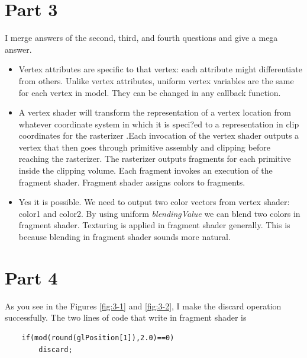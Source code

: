 \section{Part 3}

I merge answers of the second, third, and fourth questions and give a mega answer.

\begin{itemize}
  \item Vertex attributes are specific to that vertex: each attribute might differentiate from others.
Unlike vertex attributes, uniform vertex variables are the same for each vertex in model. They can be changed in any callback function.

  \item A vertex shader will transform the representation of a vertex location from whatever coordinate system in which it is
speci?ed to a representation in clip coordinates for the rasterizer .Each invocation of the vertex shader outputs a vertex
that then goes through primitive assembly and clipping before reaching the rasterizer. The rasterizer outputs fragments
for each primitive inside the clipping volume. Each fragment invokes an execution of the fragment shader. Fragment
shader assigns colors to fragments.

  \item Yes it is possible. We need to output two color vectors from vertex shader: color1 and color2. By using uniform \emph{blendingValue}
we can blend two colors in fragment shader. Texturing is applied in fragment shader generally. This is because blending in
fragment shader sounds more natural.
\end{itemize}

\section{Part 4}

As you see in the Figures \ref{fig:3-1} and \ref{fig:3-2}, I make the discard operation successfully. The two lines of code that write in fragment shader is \\

\lstset{language=C}
\begin{lstlisting}
	if(mod(round(glPosition[1]),2.0)==0)
		discard;
\end{lstlisting}


